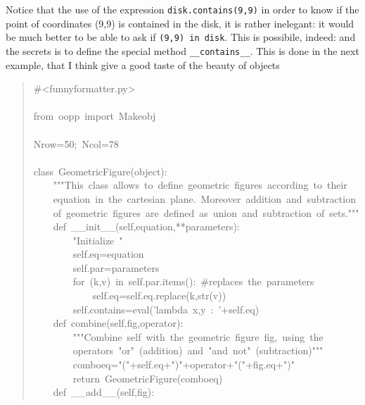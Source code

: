 \documentclass[10pt,english]{article}
\begin{document}
Notice that the use of the expression \texttt{disk.contains(9,9)} in order to
know if the point of coordinates (9,9) is contained in the disk, it is
rather inelegant: it would be much better to be able to ask if 
\texttt{(9,9) in disk}. This is possibile, indeed: and the secrets is to
define the special method \texttt{{\_}{\_}contains{\_}{\_}}. This is done in the next
example, that I think give a good taste of the beauty of objects
\begin{quote}
\begin{ttfamily}\begin{flushleft}
\mbox{{\#}<funnyformatter.py>}\\
\mbox{}\\
\mbox{from~oopp~import~Makeobj}\\
\mbox{}\\
\mbox{Nrow=50;~Ncol=78}\\
\mbox{~~}\\
\mbox{class~GeometricFigure(object):}\\
\mbox{~~~~"""This~class~allows~to~define~geometric~figures~according~to~their}\\
\mbox{~~~~equation~in~the~cartesian~plane.~Moreover~addition~and~subtraction}\\
\mbox{~~~~of~geometric~figures~are~defined~as~union~and~subtraction~of~sets."""}\\
\mbox{~~~~def~{\_}{\_}init{\_}{\_}(self,equation,**parameters):}\\
\mbox{~~~~~~~~"Initialize~"}\\
\mbox{~~~~~~~~self.eq=equation}\\
\mbox{~~~~~~~~self.par=parameters}\\
\mbox{~~~~~~~~for~(k,v)~in~self.par.items():~{\#}replaces~the~parameters}\\
\mbox{~~~~~~~~~~~~self.eq=self.eq.replace(k,str(v))}\\
\mbox{~~~~~~~~self.contains=eval('lambda~x,y~:~'+self.eq)}\\
\mbox{~~~~def~combine(self,fig,operator):}\\
\mbox{~~~~~~~~"""Combine~self~with~the~geometric~figure~fig,~using~the}\\
\mbox{~~~~~~~~operators~"or"~(addition)~and~"and~not"~(subtraction)"""}\\
\mbox{~~~~~~~~comboeq="("+self.eq+")"+operator+"("+fig.eq+")"}\\
\mbox{~~~~~~~~return~GeometricFigure(comboeq)}\\
\mbox{~~~~def~{\_}{\_}add{\_}{\_}(self,fig):}\\

\end{flushleft}
\end{ttfamily}
\end{quote}
\end{document}
